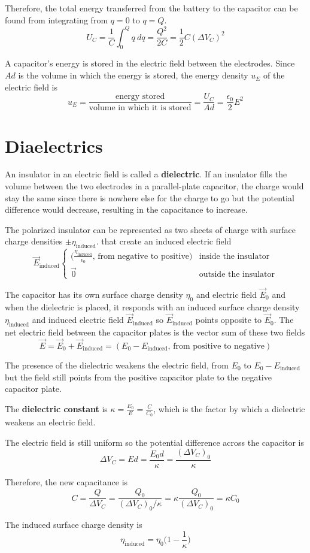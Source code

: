 \documentclass{article}
\begin{document}
Therefore, the total energy transferred from the battery to the capacitor can be found from
integrating from $q=0$ to $q=Q$.
\[U_C=\frac{1}{C}\int_{0}^{Q}q\: dq=\frac{Q^2}{2C}=\frac{1}{2}C(\Delta V_C)^2\]

A capacitor's energy is stored in the electric field between the electrodes. Since $Ad$ is the
volume in which the energy is stored, the energy density $u_E$ of the electric field is
\[u_E=\frac{\text{energy stored}}{\text{volume in which it is stored}}=\frac{U_C}{Ad}=
\frac{\epsilon_0}{2}E^2\]
\section*{Diaelectrics}

An insulator in an electric field is called a \textbf{dielectric}. If an insulator fills the volume
between the two electrodes in a parallel-plate capacitor, the charge would stay the same since
there is nowhere else for the charge to go but the potential difference would decrease, resulting
in the capacitance to increase.
\newline

The polarized insulator can be represented as two sheets of charge with surface charge densities
$\pm \eta_\text{induced}$. that create an induced electric field
\[\vec{E}_\text{induced}\begin{cases}
    \Big(\frac{\eta_\text{induced}}{\epsilon_0}\text{, from negative to positive}\Big) &
    \text{inside the insulator} \\
    \vec{0} & \text{outside the insulator}
\end{cases}\]

The capacitor has its own surface charge density $\eta_0$ and electric field $\vec{E}_0$ and when
the dielectric is placed, it responds with an induced surface charge density $\eta_\text{induced}$
and induced electric field $\vec{E}_\text{induced}$ so $\vec{E}_\text{induced}$ points opposite to
$\vec{E}_0$. The net electric field between the capacitor plates is the vector sum of these two
fields
\[\vec{E}=\vec{E}_0 + \vec{E}_\text{induced} = (E_0-E_\text{induced}
\text{, from positive to negative})\]

The presence of the dielectric weakens the electric field, from $E_0$ to $E_0 - E_\text{induced}$
but the field still points from the positive capacitor plate to the negative capacitor plate.
\newline

The \textbf{dielectric constant} is $\kappa = \frac{E_0}{E} = \frac{C}{C_0}$, which is the factor
by which a dielectric weakens an electric field.
\newline

The electric field is still uniform so the potential difference across the capacitor is
\[\Delta V_C=Ed=\frac{E_0 d}{\kappa}=\frac{(\Delta V_C)_0}{\kappa}\]

Therefore, the new capacitance is
\[C=\frac{Q}{\Delta V_C}=\frac{Q_0}{(\Delta V_C)_0 / \kappa}=\kappa \frac{Q_0}{(\Delta V_C)_0}=
\kappa C_0\]

The induced surface charge density is
\[\eta_\text{induced}=\eta_0 \Big(1-\frac{1}{\kappa}\Big)\]
\end{document}
